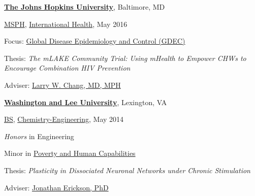 \documentclass[10pt]{article}
\newcommand{\halfblankline}{\quad\vspace{-0.5\baselineskip}\pagebreak[3]}
\begin{document}
\href{http://www.jhsph.edu/}{\textbf{The Johns Hopkins University}},
Baltimore, MD
\begin{outerlist}

\item[] \href{http://www.jhsph.edu/academics/degree-programs/masters-programs/master-of-science-in-public-health/}{MSPH},
        \href{http://www.jhsph.edu/departments/international-health/}
             {International Health}, May 2016
        \begin{innerlist}
        \item Focus: \href{http://www.jhsph.edu/departments/international-health/program-areas/global-disease-epidemiology-control/index.html}
          {Global Disease Epidemiology and Control (GDEC)}
        \item Thesis: \emph{The mLAKE Community Trial: Using mHealth to
        Empower CHWs to Encourage Combination HIV Prevention}
        \item Adviser:
              \href{http://www.hopkinsmedicine.org/profiles/results/directory/profile/0021498/larry-chang}
                   {Larry W. Chang, MD, MPH}
        \end{innerlist}
\end{outerlist}

\halfblankline

\href{https://www.wlu.edu/}{\textbf{Washington and Lee University}},
Lexington, VA

\begin{outerlist}

\item[] \href{http://catalog.wlu.edu/content.php?catoid=13&navoid=994#BS}{BS},
        \href{https://www.wlu.edu/physics-and-engineering-department}
             {Chemistry-Engineering}, May 2014
        \begin{innerlist}
        \item \emph{Honors} in Engineering
        \item Minor in \href{https://www.wlu.edu/shepherd-program}
                            {Poverty and Human Capabilities}
        \item Thesis: \emph{Plasticity in Dissociated Neuronal Networks under Chronic Stimulation}
        \item Adviser:
              \href{https://www.wlu.edu/physics-and-engineering-department/faculty-and-staff/profile?ID=x4098}
                   {Jonathan Erickson, PhD}
        \end{innerlist}

\end{outerlist}
\end{document}
